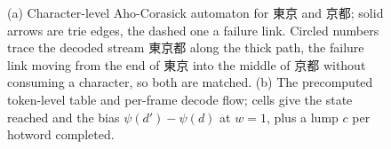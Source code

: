 \documentclass{article}
\begin{document}
\begin{figure}[t]

\caption{(a) Character-level Aho-Corasick automaton for 東京 and 京都; solid arrows are trie edges, the dashed one a failure link. Circled numbers trace the decoded stream 東京都 along the thick path, the failure link moving from the end of 東京 into the middle of 京都 without consuming a character, so both are matched. (b) The precomputed token-level table and per-frame decode flow; cells give the state reached and the bias $\psi(d')-\psi(d)$ at $w{=}1$, plus a lump $c$ per hotword completed.
}
\label{fig:automaton}
\end{figure}








\end{document}
